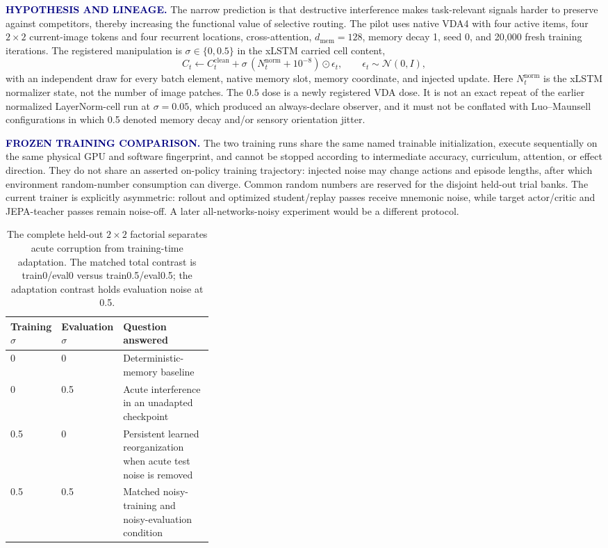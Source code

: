 \documentclass[11pt]{article}
\newcommand{\smallcapslabel}[1]{\textcolor{Navy}{\sffamily\bfseries\footnotesize\MakeUppercase{#1}}}
\begin{document}
\smallcapslabel{Hypothesis and lineage.}
The narrow prediction is that destructive interference makes task-relevant signals harder to preserve against competitors, thereby increasing the functional value of selective routing. The pilot uses native VDA4 with four active items, four $2\times2$ current-image tokens and four recurrent locations, cross-attention, $d_{\mathrm{mem}}=128$, memory decay 1, seed 0, and 20,000 fresh training iterations. The registered manipulation is $\sigma\in\{0,0.5\}$ in the xLSTM carried cell content,
\begin{equation}
C_t \leftarrow C_t^{\mathrm{clean}} + \sigma\,(N_t^{\mathrm{norm}}+10^{-8})\odot\epsilon_t,
\qquad \epsilon_t\sim\mathcal{N}(0,I),
\end{equation}
with an independent draw for every batch element, native memory slot, memory coordinate, and injected update. Here $N_t^{\mathrm{norm}}$ is the xLSTM normalizer state, not the number of image patches. The $0.5$ dose is a newly registered VDA dose. It is not an exact repeat of the earlier normalized LayerNorm-cell run at $\sigma=0.05$, which produced an always-declare observer, and it must not be conflated with Luo--Maunsell configurations in which 0.5 denoted memory decay and/or sensory orientation jitter.

\smallcapslabel{Frozen training comparison.}
The two training runs share the same named trainable initialization, execute sequentially on the same physical GPU and software fingerprint, and cannot be stopped according to intermediate accuracy, curriculum, attention, or effect direction. They do not share an asserted on-policy training trajectory: injected noise may change actions and episode lengths, after which environment random-number consumption can diverge. Common random numbers are reserved for the disjoint held-out trial banks. The current trainer is explicitly asymmetric: rollout and optimized student/replay passes receive mnemonic noise, while target actor/critic and JEPA-teacher passes remain noise-off. A later all-networks-noisy experiment would be a different protocol.

\begin{table}[H]
\centering\small
\begin{tabularx}{0.94\linewidth}{@{}L{0.17\linewidth}L{0.17\linewidth}Y@{}}
\toprule
Training $\sigma$ & Evaluation $\sigma$ & Question answered\\
 & 0 & Deterministic-memory baseline\\
0 & 0.5 & Acute interference in an unadapted checkpoint\\
0.5 & 0 & Persistent learned reorganization when acute test noise is removed\\
0.5 & 0.5 & Matched noisy-training and noisy-evaluation condition\\
\bottomrule
\end{tabularx}
\caption{The complete held-out $2\times2$ factorial separates acute corruption from training-time adaptation. The matched total contrast is train0/eval0 versus train0.5/eval0.5; the adaptation contrast holds evaluation noise at 0.5.}
\end{table}
\end{document}
